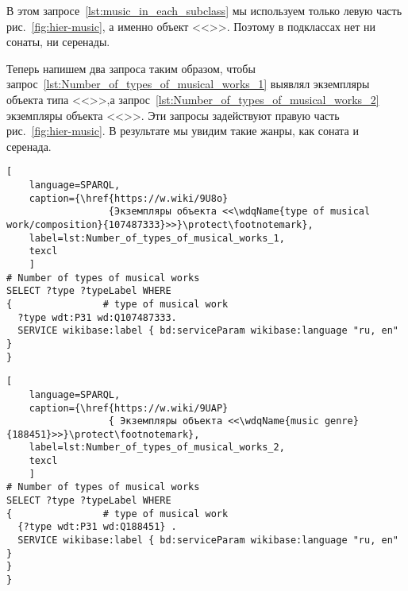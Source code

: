 
В этом запросе~\ref{lst:music_in_each_subclass} мы используем только левую часть рис.~\ref{fig:hier-music}, а именно объект  <<>>. Поэтому в подклассах нет ни сонаты, ни серенады.

Теперь напишем два запроса таким образом, чтобы запрос~\ref{lst:Number_of_types_of_musical_works_1} выявлял экземпляры объекта типа <<>>,а запрос~\ref{lst:Number_of_types_of_musical_works_2} экземпляры объекта <<>>. Эти запросы задействуют правую часть рис.~\ref{fig:hier-music}. В результате мы увидим такие жанры, как соната и серенада.

\begin{lstlisting}[ 
    language=SPARQL,
    caption={\href{https://w.wiki/9U8o}
                  {Экземпляры объекта <<\wdqName{type of musical work/composition}{107487333}>>}\protect\footnotemark},
    label=lst:Number_of_types_of_musical_works_1,
    texcl
    ]
# Number of types of musical works
SELECT ?type ?typeLabel WHERE 
{                # type of musical work
  ?type wdt:P31 wd:Q107487333.      
  SERVICE wikibase:label { bd:serviceParam wikibase:language "ru, en" }
}
\end{lstlisting}%

\begin{lstlisting}[ 
    language=SPARQL,
    caption={\href{https://w.wiki/9UAP}
                  { Экземпляры объекта <<\wdqName{music genre}{188451}>>}\protect\footnotemark},
    label=lst:Number_of_types_of_musical_works_2,
    texcl
    ]
# Number of types of musical works
SELECT ?type ?typeLabel WHERE 
{                # type of musical work
  {?type wdt:P31 wd:Q188451} .
  SERVICE wikibase:label { bd:serviceParam wikibase:language "ru, en" }
}
}
\end{lstlisting}%

